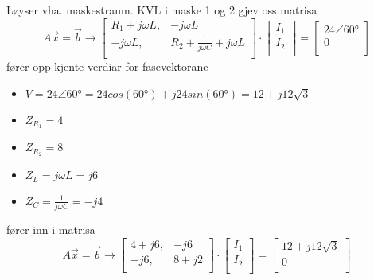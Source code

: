 \documentclass[12pt,a4paper]{article}
\begin{document}
    Løyser vha. maskestraum. KVL i maske 1 og 2 gjev oss matrisa
    \begin{equation}
      A\vec{x} = \vec{b} \rightarrow
      \left[ \begin{array}{cc}
        R_1 + j\omega L, & -j\omega L \\
        - j\omega L, & R_2 + \frac{1}{j\omega C} + j\omega L \\
      \end{array} \right]
      \cdot
      \left[ \begin{array}{c}
        I_1 \\
        I_2 \\
      \end{array} \right]
      =
      \left[ \begin{array}{c}
        24\angle{\ang{60}} \\
        0 \\
      \end{array} \right]
    \end{equation}
    fører opp kjente verdiar for fasevektorane
    \begin{itemize}
      \item $V = 24\angle \ang{60} = 24cos(\ang{60}) + j24sin(\ang{60}) = 12 + j12\sqrt{3}$
      \item $Z_{R_1} = 4$
      \item $Z_{R_2} = 8$
      \item $Z_L = j\omega L = j6$
      \item $Z_C = \frac{1}{j\omega C} = -j4$
    \end{itemize}
    fører inn i matrisa
    \begin{equation}
      A\vec{x} = \vec{b} \rightarrow
      \left[ \begin{array}{cc}
        4 + j6, & -j6 \\
        -j6, & 8 + j2 \\
      \end{array} \right]
      \cdot
      \left[ \begin{array}{c}
        I_1 \\
        I_2 \\
      \end{array} \right]
      =
      \left[ \begin{array}{c}
        12 + j12\sqrt{3} \\
        0 \\
      \end{array} \right]
    \end{equation}
\end{document}
